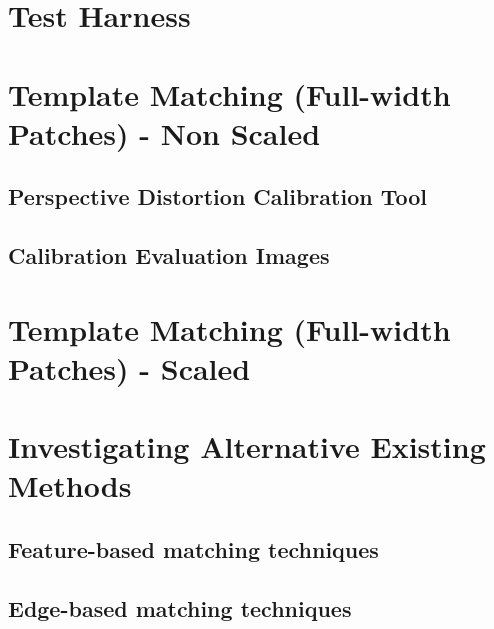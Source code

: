 \section{Test Harness}

\section{Template Matching (Full-width Patches) - Non Scaled}

\subsection{Perspective Distortion Calibration Tool}

\subsection{Calibration Evaluation Images}

\section{Template Matching (Full-width Patches) - Scaled}

\section{Investigating Alternative Existing Methods}

\subsection{Feature-based matching techniques}

\subsection{Edge-based matching techniques}




